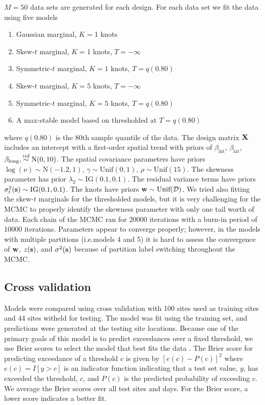\documentclass[11pt]{article}
\begin{document}
$M = 50$ data sets are generated for each design.
For each data set we fit the data using five models
\begin{enumerate} \setlength{\itemsep}{-0.5em}
  \item Gaussian marginal, $K=1$ knots
  \item Skew-$t$ marginal, $K=1$ knots, $T=-\infty$
  \item Symmetric-$t$ marginal, $K=1$ knots, $T=q(0.80)$
  \item Skew-$t$ marginal, $K=5$ knots, $T=-\infty$
  \item Symmetric-$t$ marginal, $K=5$ knots, $T=q(0.80)$
  \item A max-stable model based on \citet{Reich2012} thresholded at $T = q(0.80)$
\end{enumerate}
where $q(0.80)$ is the 80th sample quantile of the data.
The design matrix $\mbox{\bf X}$ includes an intercept with a first-order spatial trend with priors of $\beta_\text{int}$, $\beta_\text{lat}$, $\beta_\text{long},  \stackrel{iid}{\sim} \text{N}(0, 10)$.
The spatial covariance parameters have priors $\log(\nu) \sim \text{N}(-1.2, 1)$, $\gamma \sim \text{Unif}(0, 1)$, $\rho \sim \text{Unif}(15)$.
The skewness parameter has prior $\lambda_2 \sim \text{IG}(0.1, 0.1)$.
The residual variance terms have priors $\sigma^2_t(\mbox{\bf s}) \sim \text{IG}(0.1, 0.1)$.
The knots have priors $\mbox{\bf w} \sim \text{Unif}({\cal D})$.
We tried also fitting the skew-$t$ marginals for the thresholded models, but it is very challenging for the MCMC to properly identify the skewness parameter with only one tail worth of data.
Each chain of the MCMC ran for 20000 iterations with a burn-in period of 10000 iterations.
Parameters appear to converge properly; however, in the models with multiple partitions (i.e.models 4 and 5) it is hard to assess the convergence of $\mbox{\bf w}$, $z(\mbox{\bf s})$, and $\sigma^2(\mbox{\bf s})$ because of partition label switching throughout the MCMC.

\subsection{Cross validation}\label{s:modelselect}
Models were compared using cross validation with 100 sites used as training sites and 44 sites witheld for testing.
The model was fit using the training set, and predictions were generated at the testing site locations.
Because one of the primary goals of this model is to predict exceedances over a fixed threshold, we use Brier scores to select the model that best fits the data \citep{Gneiting2007}.
The Brier score for predicting exceedance of a threshold $c$ is given by $[e(c) - P(c)]^2$ where $e(c) = I[y>c]$ is an indicator function indicating that a test set value, $y$, has exceeded the threshold, $c$, and $P(c)$ is the predicted probability of exceeding $c$.
We average the Brier scores over all test sites and days.
For the Brier score, a lower score indicates a better fit.
\end{document}
